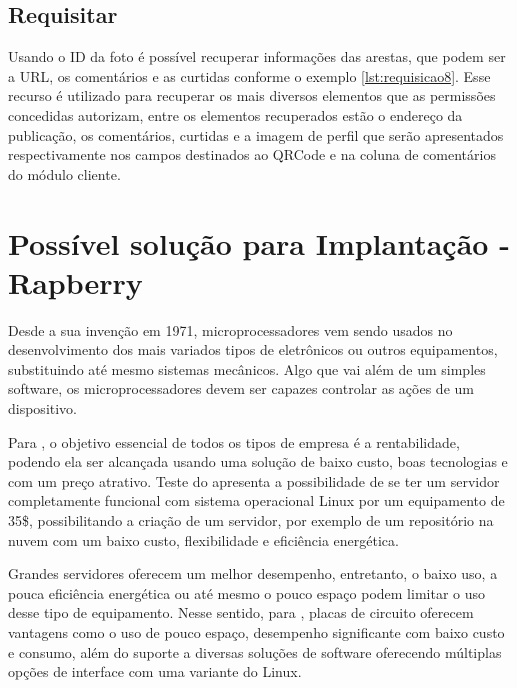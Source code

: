 \subsection{Requisitar}
Usando o ID da foto é possível recuperar informações das arestas, que podem ser a URL, os comentários e as curtidas conforme o exemplo \ref{lst:requisicao8}. Esse recurso é utilizado para recuperar os mais diversos elementos que as permissões concedidas autorizam, entre os elementos recuperados estão o endereço da publicação, os comentários, curtidas e a imagem de perfil que serão apresentados respectivamente nos campos destinados ao QRCode e na coluna de comentários do módulo cliente.

\section{Possível solução para Implantação - Rapberry}
Desde a sua invenção em 1971, microprocessadores vem sendo usados no desenvolvimento dos mais variados tipos de eletrônicos ou outros equipamentos, substituindo até mesmo sistemas mecânicos. Algo que vai além de um simples software, os microprocessadores devem ser capazes controlar as ações de um dispositivo. \cite{rosenstark2007}

Para \cite{aristotelous2016}, o objetivo essencial de todos os tipos de empresa é a rentabilidade, podendo ela ser alcançada usando uma solução de baixo custo, boas tecnologias e com um preço atrativo. Teste do \cite{aristotelous2016} apresenta a possibilidade de se ter um servidor completamente funcional com sistema operacional Linux por um equipamento de 35\$, possibilitando a criação de um servidor, por exemplo de um repositório na nuvem com um baixo custo, flexibilidade e eficiência energética. 

Grandes servidores oferecem um melhor desempenho, entretanto, o baixo uso, a pouca eficiência energética ou até mesmo o pouco espaço podem limitar o uso desse tipo de equipamento. Nesse sentido, para \cite{cusick2014}, placas de circuito oferecem vantagens como o uso de pouco espaço, desempenho significante com baixo custo e consumo, além do suporte a diversas soluções de software oferecendo múltiplas opções de interface com uma variante do Linux. 
